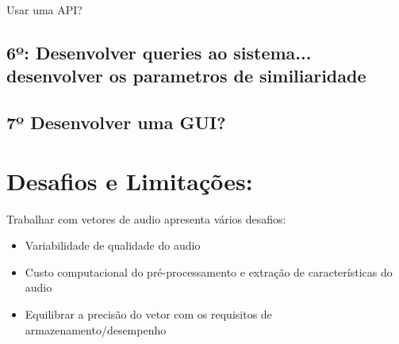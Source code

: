 \documentclass{article}
\begin{document}
Usar uma API? 

\subsection{6º: Desenvolver queries ao sistema... desenvolver os parametros de similiaridade}

\subsection{7º Desenvolver uma GUI? }


\section{Desafios e Limitações: }

Trabalhar com vetores de audio apresenta vários desafios:

\begin{itemize}
    \item Variabilidade de qualidade do audio  
    \item Custo computacional do pré-processamento e extração de características do audio
    \item Equilibrar a precisão do vetor com os requisitos de armazenamento/desempenho
\end{itemize}



\end{document}
